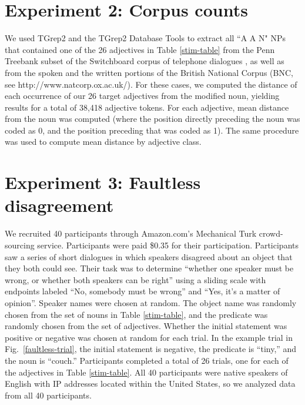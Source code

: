 \documentclass{pnastwo}
\newcommand{\tableref}[1]{Table \ref{#1}}
\newcommand{\figref}[1]{Fig.~\ref{#1}}
\begin{document}
\begin{article}
\begin{materials}
\section{Experiment 2: Corpus counts} 
We used TGrep2 \cite{rohde2005} and the TGrep2 Database Tools \cite{degenjaeger-tdt} to extract all ``A A N"  NPs that contained one of the 26 adjectives in Table \ref{stim-table} from the Penn Treebank subset of the Switchboard corpus of telephone dialogues \cite{godfrey1992}, as well as from the spoken and the written portions of the British National Corpus (BNC, see http://www.natcorp.ox.ac.uk/). For these cases, we computed the distance of each occurrence of our 26 target adjectives from the modified noun, yielding results for a total of 38,418 adjective tokens.  For each adjective, mean distance from the noun was computed (where the position directly preceding the noun was coded as 0, and the position preceding that was coded as 1). The same procedure was used to compute mean distance by adjective class.

\section{Experiment 3: Faultless disagreement}
We recruited 40 participants through Amazon.com's Mechanical Turk crowd-sourcing service. Participants were paid \$0.35 for their participation. Participants saw a series of short dialogues in which speakers disagreed about an object that they both could see.  Their task was to determine ``whether one speaker must be wrong, or whether both speakers can be right'' using a sliding scale with endpoints labeled ``No, somebody must be wrong'' and ``Yes, it's a matter of opinion''. Speaker names were chosen at random. The object name was randomly chosen from the set of nouns in Table \ref{stim-table}, and the predicate was randomly chosen from the set of adjectives. Whether the initial statement was positive or negative was chosen at random for each trial. In the example trial in Fig.~\ref{faultless-trial}, the initial statement is negative, the predicate is ``tiny,'' and the noun is ``couch.'' Participants completed a total of 26 trials, one for each of the adjectives in Table \ref{stim-table}.
All 40 participants were native speakers of English with IP addresses located within the United States, so we analyzed data from all 40 participants.


\end{materials}
\end{article}
\end{document}
